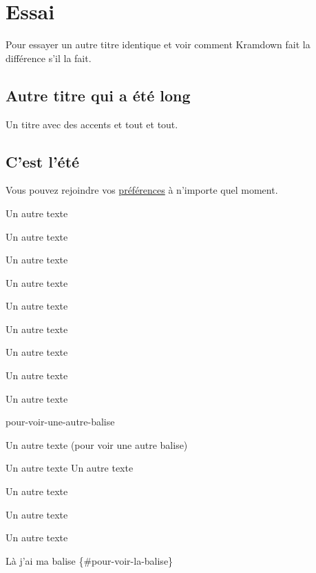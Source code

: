 % 
% 
% 
% 
% 
% 
% 
% 

\chapter{Essai}\hypertarget{specific-id-pour-essai}{}\label{specific-id-pour-essai}

Pour essayer un autre titre identique et voir comment Kramdown fait la différence s'il la fait.

\section{Autre titre qui a été long}\hypertarget{autre-titre-qui-a-t-long}{}\label{autre-titre-qui-a-t-long}

Un titre avec des accents et tout et tout.

\section{C'est l'été}\hypertarget{cest-lt}{}\label{cest-lt}

Vous pouvez rejoindre vos \hyperlink{preferences-auteur}{préférences} à n'importe quel moment.

Un autre texte

Un autre texte

Un autre texte

Un autre texte

Un autre texte

Un autre texte

Un autre texte

Un autre texte

Un autre texte

pour-voir-une-autre-balise

Un autre texte (pour voir une autre balise)

Un autre texte
Un autre texte

Un autre texte

Un autre texte

Un autre texte

Là j'ai ma balise \{\#pour-voir-la-balise\}

